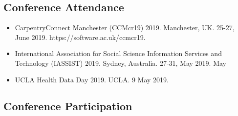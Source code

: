 \subsection{Conference Attendance}

\begin{itemize}
  \item CarpentryConnect Manchester (CCMcr19) 2019. Manchester, UK. 25-27, June 2019. https://software.ac.uk/ccmcr19.
  \item International Association for Social Science Information Services and Technology (IASSIST) 2019. Sydney, Australia. 27-31, May 2019. May
  \item UCLA Health Data Day 2019. UCLA. 9 May 2019.
\end{itemize}


\subsection{Conference Participation}

\nocite{*}
\printbibliography[keyword={outlib-conf-part},title={Library-sponsored classes/workshops},heading=none]


